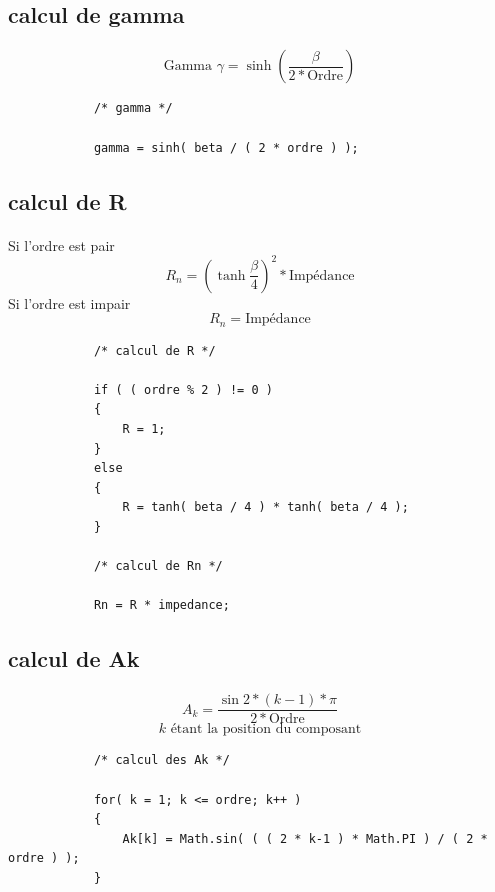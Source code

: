 \documentclass[a4paper,11pt]{article}
\begin{document}
    \subsection{calcul de gamma}
        \paragraph{}
        \[ \mbox{Gamma } \gamma = \sinh( \frac{ \beta }{ 2 * \mbox{Ordre} } ) \]
        \begin{lstlisting}
            /* gamma */

            gamma = sinh( beta / ( 2 * ordre ) );

        \end{lstlisting}

    \clearpage

    \subsection{calcul de R}
        \paragraph{}
        Si l'ordre est pair \[ R_{n} = ( \tanh{ \frac{ \beta }{ 4 } } ) ^2 * \mbox{Impédance} \]
        Si l'ordre est impair \[ R_{n} = \mbox{Impédance} \]
        \begin{lstlisting}
            /* calcul de R */

            if ( ( ordre % 2 ) != 0 )
            {
                R = 1;
            }
            else
            {
                R = tanh( beta / 4 ) * tanh( beta / 4 );
            }

            /* calcul de Rn */

            Rn = R * impedance;

        \end{lstlisting}

    \subsection{calcul de Ak }
        \paragraph{}
        \[ A_{k} = \frac{\sin{2 * (k-1) * \pi}}{2 * \mbox{Ordre}} \]
        \[ k \mbox{ étant la position du composant} \]
        \begin{lstlisting}
            /* calcul des Ak */

            for( k = 1; k <= ordre; k++ )
            {
                Ak[k] = Math.sin( ( ( 2 * k-1 ) * Math.PI ) / ( 2 * ordre ) );
            }

        \end{lstlisting}
\end{document}

